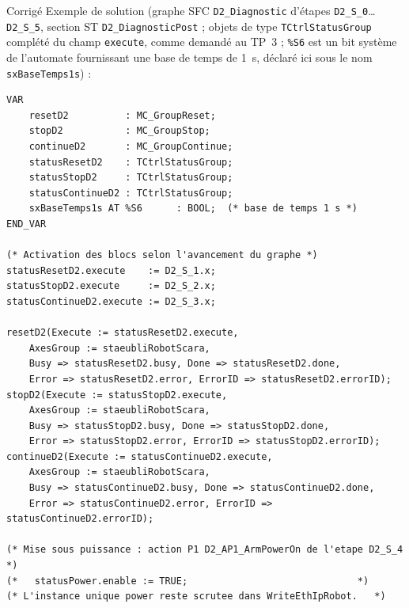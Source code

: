 \begin{UPSTIactivite}

\begin{UPSTIcorrectionP}{Corrigé}
Exemple de solution (graphe SFC \texttt{D2\_Diagnostic} d'étapes
\texttt{D2\_S\_0}\dots\texttt{D2\_S\_5}, section ST
\texttt{D2\_DiagnosticPost} ; objets de type \texttt{TCtrlStatusGroup}
complété du champ \texttt{execute}, comme demandé au TP~3 ; \texttt{\%S6} est un bit système de l'automate fournissant une base de temps de 1~s, déclaré ici sous le nom \texttt{sxBaseTemps1s}) :
\begin{lstlisting}
VAR
    resetD2          : MC_GroupReset;
    stopD2           : MC_GroupStop;
    continueD2       : MC_GroupContinue;
    statusResetD2    : TCtrlStatusGroup;
    statusStopD2     : TCtrlStatusGroup;
    statusContinueD2 : TCtrlStatusGroup;
    sxBaseTemps1s AT %S6      : BOOL;  (* base de temps 1 s *)
END_VAR

(* Activation des blocs selon l'avancement du graphe *)
statusResetD2.execute    := D2_S_1.x;
statusStopD2.execute     := D2_S_2.x;
statusContinueD2.execute := D2_S_3.x;

resetD2(Execute := statusResetD2.execute,
    AxesGroup := staeubliRobotScara,
    Busy => statusResetD2.busy, Done => statusResetD2.done,
    Error => statusResetD2.error, ErrorID => statusResetD2.errorID);
stopD2(Execute := statusStopD2.execute,
    AxesGroup := staeubliRobotScara,
    Busy => statusStopD2.busy, Done => statusStopD2.done,
    Error => statusStopD2.error, ErrorID => statusStopD2.errorID);
continueD2(Execute := statusContinueD2.execute,
    AxesGroup := staeubliRobotScara,
    Busy => statusContinueD2.busy, Done => statusContinueD2.done,
    Error => statusContinueD2.error, ErrorID => statusContinueD2.errorID);

(* Mise sous puissance : action P1 D2_AP1_ArmPowerOn de l'etape D2_S_4 *)
(*   statusPower.enable := TRUE;                              *)
(* L'instance unique power reste scrutee dans WriteEthIpRobot.   *)


\end{lstlisting}
\end{UPSTIcorrectionP}
\end{UPSTIactivite}
